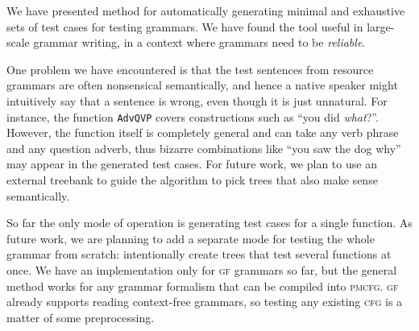 \documentclass[11pt]{article}
\def\t#1{\texttt{#1}}
\def\gf{\textsc{gf}}
\def\cfg{\textsc{cfg}}
\def\pmcfg{\textsc{pmcfg}}
\newcommand{\todo}[1]{{\color{cyan}\textbf{[TODO: }#1\textbf{]}}}
\begin{document}
We have presented method for automatically generating minimal and exhaustive sets of test cases for testing grammars.  We have found the tool useful in large-scale grammar writing, in a context where grammars need to be \emph{reliable}.

One problem
we have encountered is that the test sentences from resource grammars are often
nonsensical semantically, and hence a native speaker might intuitively
say that a sentence is wrong, even though it is just unnatural. 
For instance, the function \t{AdvQVP} covers constructions such as ``you
did \emph{what}?''. However, the function itself is completely general
and can take any verb phrase and any question adverb, thus  bizarre
combinations like ``you saw the dog why'' may appear in the generated
test cases. For future work, we plan to use an external treebank to guide the algorithm to pick trees that also make sense semantically.

So far the only mode of operation is generating test cases for a
single function. 
As future work, we are planning to add a separate
mode for testing the whole grammar from scratch: intentionally create
trees that test several functions at once.
We have an implementation only for \gf{} grammars so far, but the
general method works for any grammar formalism that can be compiled
into \pmcfg{}. \gf{} already supports reading context-free grammars,
so testing any existing \cfg{} is a matter of some preprocessing. 









\end{document}
